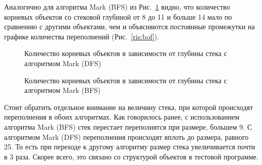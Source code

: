 Аналогично для алгоритма Mark (BFS) из Рис.~\ref{ris:bm} видно, что количество корневых объектов со стековой глубиной от 8 до 11 и больше 14 мало по сравнению с другими 
объектами, чем и объясняются постоянные промежутки на графике количества переполнений (Рис.~\ref{ris:bof}).

   \begin{figure}[p!]
   
   \caption{Количество корневых объектов в зависимости от глубины стека с алгоритмом Mark (DFS)}
   \label{ris:dm}
   
   \caption{Количество корневых объектов в зависимости от глубины стека с алгоритмом Mark (BFS)}
   \label{ris:bm}
   
   \end{figure}


Стоит обратить отдельное внимание на величину стека, при которой происходят переполнения в обоих алгоритмах. Как говорилось ранее, с использованием алгоритма
Mark (BFS) стек перестает переполнятся при размере, большем 9. С алгоритмом Mark (DFS) переполнения происходят вплоть до размера, равного 25. То есть при переходе 
к другому алгоритму размер стека увеличивается почти в 3 раза. Скорее всего, это связано со структурой объектов в тестовой программе. 

